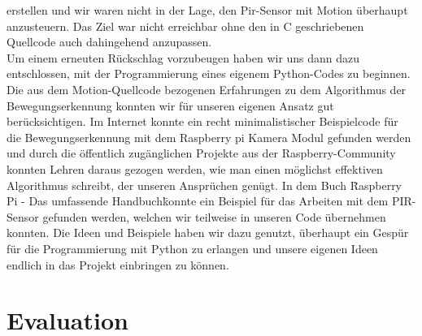 \documentclass[journal]{IEEEtran}
\begin{document}
erstellen und wir waren nicht in der Lage, den Pir-Sensor mit Motion überhaupt anzusteuern. Das Ziel war nicht erreichbar ohne den in C geschriebenen Quellcode auch dahingehend anzupassen. \\ Um einem erneuten Rückschlag vorzubeugen haben wir uns dann dazu entschlossen, mit der Programmierung eines eigenem Python-Codes zu beginnen. Die aus dem Motion-Quellcode bezogenen Erfahrungen zu dem Algorithmus der Bewegungserkennung konnten wir für unseren eigenen Ansatz gut berücksichtigen. Im Internet konnte ein recht minimalistischer Beispielcode für die Bewegungserkennung mit dem Raspberry pi Kamera Modul gefunden werden\cite{motioncode} und durch die öffentlich zugänglichen Projekte aus der Raspberry-Community konnten Lehren daraus gezogen werden, wie man einen möglichst effektiven Algorithmus schreibt, der unseren Ansprüchen genügt. In dem Buch \"Raspberry Pi - Das umfassende Handbuch\" konnte ein Beispiel für das Arbeiten mit dem PIR-Sensor gefunden werden\cite[S. 495]{Raspi}, welchen wir teilweise in unseren Code übernehmen konnten. Die Ideen und Beispiele haben wir dazu genutzt, überhaupt ein Gespür für die Programmierung mit Python zu erlangen und unsere eigenen Ideen endlich in das Projekt einbringen zu können. \\



\section{Evaluation}
\end{document}
